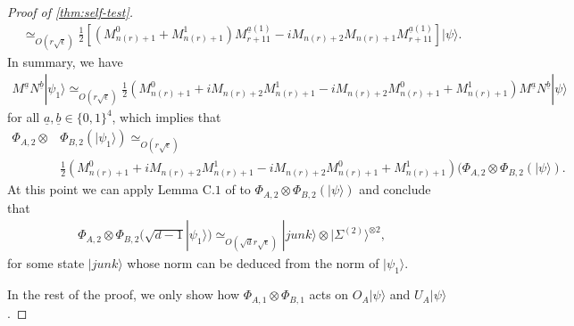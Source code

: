 \documentclass[11pt,letterpaper]{article}
\newcommand{\ket}[1]{|#1\rangle}
\newcommand{\x}{\otimes}
\newcommand{\1}{\mathbb{1}}
\newcommand{\EPR}[1]{\Sigma^{(#1)}}
\newcommand{\nr}{n(r)}
\newcommand{\ua}{\underline{a}}
\newcommand{\ub}{\underline{b}}
\newcommand{\se}{\sqrt{\epsilon}}
\newcommand{\sd}{\sqrt{d}}
\newcommand{\appd}[1]{\simeq_{#1}}
\theoremstyle{definition}
\begin{document}
\begin{proof}[Proof of \cref{thm:self-test}]
\begin{align*}
	&\appd{O(r\se)}\frac{1}{2} [(M_{\nr+1}^0+M_{\nr+1}^1) M_{r+11}^{\ua(1)} - iM_{\nr+2}M_{\nr+1}M_{r+11}^{\ua(1)} ] \ket{\psi}.
\end{align*}
In summary, we have 
\begin{align}
	M^{\ua} N^{\ub} \ket{\psi_1} \appd{O(r\se)} \frac{1}{2} (M_{\nr+1}^0 + iM_{\nr+2}M_{\nr+1}^1 - iM_{\nr+2}M_{\nr+1}^0 + M_{\nr+1}^1)M^{\ua}N^{\ub} \ket{\psi}
\end{align}
for all $\ua, \ub \in \{0,1\}^4$, which implies that 
\begin{align*}
	\Phi_{A,2} \x& \Phi_{B,2}(\ket{\psi_1}) \appd{O(r\se)}\\
	 &\frac{1}{2} (M_{\nr+1}^0 + iM_{\nr+2}M_{\nr+1}^1 - iM_{\nr+2}M_{\nr+1}^0 + M_{\nr+1}^1)(\Phi_{A,2}\x\Phi_{B,2} (\ket{\psi}).
\end{align*}
At this point we can apply Lemma C.$1$ of \cite{wu2016} to $\Phi_{A,2}\x\Phi_{B,2} (\ket{\psi})$ and conclude that 
\begin{align}
	\Phi_{A,2} \x \Phi_{B,2}(\sqrt{d-1} \ket{\psi_1}) \appd{O(\sd r \se)} \ket{junk} \x \ket{\EPR{2}}^{\x 2},
\end{align} 
for some state $\ket{junk}$ whose norm can be deduced from the norm of $\ket{\psi_1}$.

In the rest of the proof, we only show how $\Phi_{A,1} \x \Phi_{B,1}$ acts on $O_A\ket{\psi}$ and $U_A\ket{\psi}$.


\end{proof}
\end{document}
